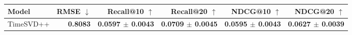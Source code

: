 \begin{tabular}{lrrrrr}
\toprule
Model & RMSE $\downarrow$ & Recall@10 $\uparrow$ & Recall@20 $\uparrow$ & NDCG@10 $\uparrow$ & NDCG@20 $\uparrow$ \\
\midrule
TimeSVD++ & \textbf{0.8083} & \textbf{0.0597 $\pm$ 0.0043} & \textbf{0.0709 $\pm$ 0.0045} & \textbf{0.0595 $\pm$ 0.0043} & \textbf{0.0627 $\pm$ 0.0039} \\
\bottomrule
\end{tabular}
